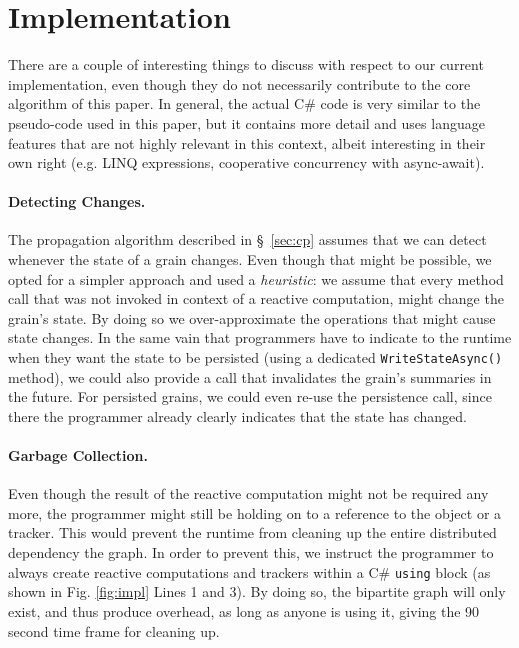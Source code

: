 \section{Implementation} \label{sec:implementation}
There are a couple of interesting things to discuss with respect to our current implementation, even though they do not necessarily contribute to the core algorithm of this paper. In general, the actual C\# code is very similar to the pseudo-code used in this paper, but it contains more detail and uses language features that are not highly relevant in this context, albeit interesting in their own right (e.g. LINQ expressions, cooperative concurrency with async-await).


\paragraph{Detecting Changes.} The propagation algorithm described in \S~\ref{sec:cp} assumes that we can detect whenever the state of a grain changes. Even though that might be possible, we opted for a simpler approach and used a \textit{heuristic}: we assume that every method call that was not invoked in context of a reactive computation, might change the grain's state. By doing so we over-approximate the operations that might cause state changes. In the same vain that programmers have to indicate to the runtime when they want the state to be persisted (using a dedicated \texttt{WriteStateAsync()} method), we could also provide a call that invalidates the grain's summaries in the future. For persisted grains, we could even re-use the persistence call, since there the programmer already clearly indicates that the state has changed.

\paragraph{Garbage Collection.} Even though the result of the reactive computation might not be required any more, the programmer might still be holding on to a reference to the object or a tracker. This would prevent the runtime from cleaning up the entire distributed dependency the graph. In order to prevent this, we instruct the programmer to always create reactive computations and trackers within a C\# \texttt{using} block (as shown in Fig. \ref{fig:impl} Lines 1 and 3). By doing so, the bipartite graph will only exist, and thus produce overhead, as long as anyone is using it, giving the 90 second time frame for cleaning up.


